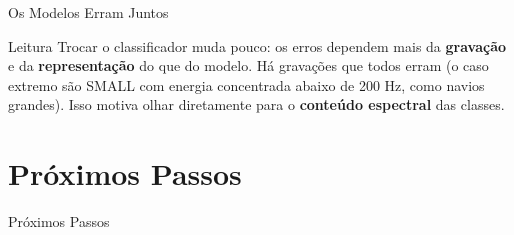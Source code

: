 \documentclass[aspectratio=169]{beamer}
\begin{document}
\begin{frame}{Os Modelos Erram Juntos}
    \vspace{0.1cm}
    \begin{alertblock}{Leitura}
        \scriptsize
        Trocar o classificador muda pouco: os erros dependem mais da \textbf{gravação} e da \textbf{representação} do que do modelo. Há gravações que todos erram (o caso extremo são SMALL com energia concentrada abaixo de 200 Hz, como navios grandes). Isso motiva olhar diretamente para o \textbf{conteúdo espectral} das classes.
    \end{alertblock}
\end{frame}

\section{Próximos Passos}

\begin{frame}
    \centering
    \huge Próximos Passos
\end{frame}
\end{document}

